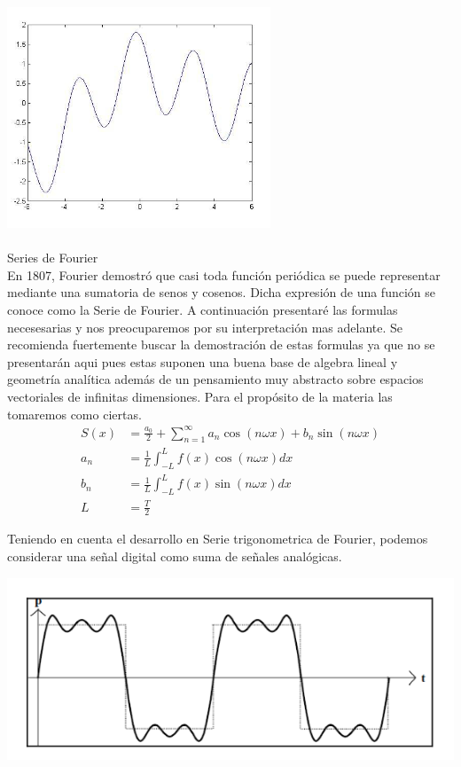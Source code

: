 \documentclass[]{article}
\begin{document}
\includegraphics{../../../Imagenes/Superior/Fourier/Fourier02.PNG}
\\
\\
\huge Series de Fourier
\normalsize
\\

En 1807, Fourier demostró que casi toda función periódica se puede representar mediante una sumatoria de senos y cosenos. Dicha expresión de una función se conoce como la Serie de Fourier. A continuación presentaré las formulas necesesarias y nos preocuparemos por su interpretación mas adelante. Se recomienda fuertemente buscar la demostración de estas formulas ya que no se presentarán aqui pues estas suponen una buena base de algebra lineal y geometría analítica además de un pensamiento muy abstracto sobre espacios vectoriales de infinitas dimensiones. Para el propósito de la materia las tomaremos como ciertas.
\begin{align}
S(x)  &= \frac{a_0}{2} + \sum_{n=1}^{\infty} a_n \cos(n\omega x) +b_n\sin(n \omega x) \\
 a_n &= \frac{1}{L}\int_{-L}^{L}f(x)\cos(n\omega x)dx  \\
 b_n &=\frac{1}{L}\int_{-L}^{L}f(x)\sin(n\omega x)dx  \\
  L&= \frac{T}{2}
\end{align}

Teniendo en cuenta el desarrollo en Serie trigonometrica de Fourier, podemos considerar una señal digital como suma de señales analógicas.

\includegraphics{../../../Imagenes/Superior/Fourier/Fourier03.PNG}
\end{document}
